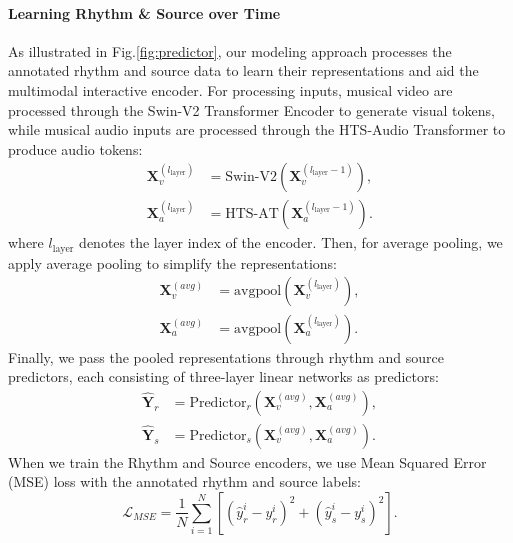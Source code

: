 \documentclass[11pt]{article}
\begin{document}
\paragraph{Learning Rhythm \& Source over Time}
As illustrated in Fig.\ref{fig:predictor}, our modeling approach processes the annotated rhythm and source data to learn their representations and aid the multimodal interactive encoder.
For processing inputs, musical video are processed through the Swin-V2 Transformer Encoder to generate visual tokens, while musical audio inputs are processed through the HTS-Audio Transformer to produce audio tokens:
\begin{equation}
\begin{aligned}
\mathbf{X}_v^{(l_{\text{layer}})} &= \text{Swin-V2}(\mathbf{X}_v^{(l_{\text{layer}}-1)}), \\
\mathbf{X}_a^{(l_{\text{layer}})} &= \text{HTS-AT}(\mathbf{X}_a^{(l_{\text{layer}}-1)}).
\end{aligned}
\end{equation}
where $l_{\text{layer}}$ denotes the layer index of the encoder.
Then, for average pooling, we apply average pooling to simplify the representations:
\begin{equation}
\begin{aligned}
\mathbf{X}_v^{(avg)} &= \text{avgpool}(\mathbf{X}_v^{(l_{\text{layer}})}), \\
\mathbf{X}_a^{(avg)} &= \text{avgpool}(\mathbf{X}_a^{(l_{\text{layer}})}).
\end{aligned}
\end{equation}
Finally, we pass the pooled representations through rhythm and source predictors, each consisting of three-layer linear networks as predictors:
\begin{equation}
\begin{aligned}
\mathbf{\hat{Y}}_{r} &= \text{Predictor}_{r}(\mathbf{X}_v^{(avg)}, \mathbf{X}_a^{(avg)}),  \\
\mathbf{\hat{Y}}_{s} &= \text{Predictor}_{s}(\mathbf{X}_v^{(avg)}, \mathbf{X}_a^{(avg)}).
\end{aligned}
\end{equation}
When we train the Rhythm and Source encoders, we use Mean Squared Error (MSE) loss with the annotated rhythm and source labels:
\begin{equation}
\mathcal{L}_{MSE} = \frac{1}{N} \sum_{i=1}^{N} \left[ ({\hat{y}}^{i}_{r} - {{y}}^{i}_{r})^2 + ({\hat{y}}^{i}_{s} - {{y}}^{i}_{s})^2 \right].
\end{equation}
\end{document}
